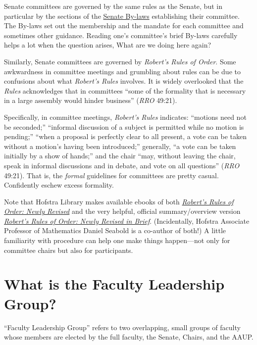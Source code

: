 \documentclass[12pt]{article}
\begin{document}
Senate committees are governed by the same rules as the Senate, but in
particular by the sections of the
\href{https://www.hofstra.edu/sites/default/files/2022-04/senatebylaws.pdf}{Senate
By-laws} establishing their committee. The By-laws set out the
membership and the mandate for each committee and sometimes other
guidance. Reading one's committee's brief By-laws carefully helps a lot
when the question arises, What are we doing here again?

Similarly, Senate committees are governed by \emph{Robert's Rules of
Order}. Some awkwardness in committee meetings and grumbling about rules
can be due to confusions about what \emph{Robert's Rules} involves. It
is widely overlooked that the \emph{Rules} acknowledges that in
committees ``some of the formality that is necessary in a large assembly
would hinder business'' (\emph{RRO} 49:21).

Specifically, in committee meetings, \emph{Robert's Rules} indicates:
``motions need not be seconded;'' ``informal discussion of a subject is
permitted while no motion is pending;'' ``when a proposal is perfectly
clear to all present, a vote can be taken without a motion's having been
introduced;'' generally, ``a vote can be taken initially by a show of
hands;'' and the chair ``may, without leaving the chair, speak in
informal discussions and in debate, and vote on all questions''
(\emph{RRO} 49:21). That is, the \emph{formal} guidelines for committees
are pretty casual. Confidently eschew excess formality.

Note that Hofstra Library makes available ebooks of both
\href{https://hofstra.on.worldcat.org/oclc/1192561100}{\emph{Robert's
Rules of Order: Newly Revised}} and the very helpful, official
summary/overview version
\href{https://hofstra.on.worldcat.org/oclc/1192973323}{\emph{Robert's
Rules of Order: Newly Revised in Brief}}. (Incidentally, Hofstra
Associate Professor of Mathematics Daniel Seabold is a co-author of
both!) A little familiarity with procedure can help one make things
happen---not only for committee chairs but also for participants.

\section{What is the Faculty Leadership
Group?}\label{what-is-the-faculty-leadership-group}

``Faculty Leadership Group'' refers to two overlapping, small groups of
faculty whose members are elected by the full faculty, the Senate,
Chairs, and the AAUP.
\end{document}
